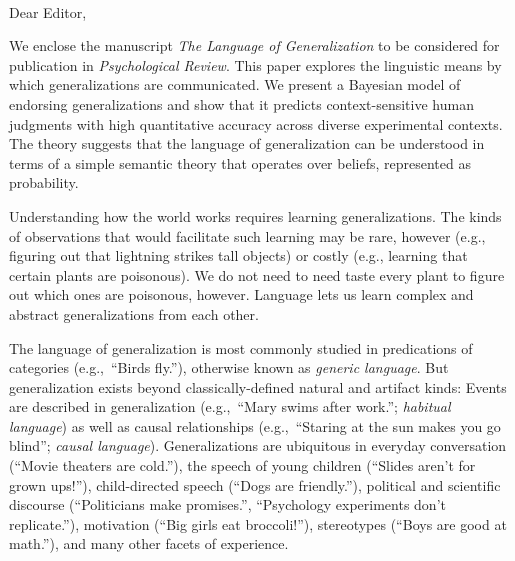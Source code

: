 \documentclass[11pt,letterpaper]{letter} %
\def\opening#1{\thispagestyle{empty}
{\centering\fromaddress \vspace{0.6in} \\ %
\hspace*{\longindentation}\hspace*{\fill}\par} %
\vspace{0.4in} %
\noindent #1 %
}
\begin{document}
\begin{letter}

\opening{Dear Editor,}

We enclose the manuscript \emph{The Language of Generalization} to be considered for publication in \emph{Psychological Review}. 
This paper explores the linguistic means by which generalizations are communicated.  
We present a Bayesian model of endorsing generalizations and show that it predicts context-sensitive human judgments with high quantitative accuracy across diverse experimental contexts.
The theory suggests that the language of generalization can be understood in terms of a simple semantic theory that operates over beliefs, represented as probability.

Understanding how the world works requires learning generalizations. 
The kinds of observations that would facilitate such learning may be rare, however (e.g., figuring out that lightning strikes tall objects) or costly (e.g., learning that certain plants are poisonous).
We do not need to need taste every plant to figure out which ones are poisonous, however.
Language lets us learn complex and abstract generalizations from each other.

The language of generalization is most commonly studied in predications of categories (e.g.,~``Birds fly.''), otherwise known as \emph{generic language}.
But generalization exists beyond classically-defined natural and artifact kinds: Events are described in generalization (e.g.,~``Mary swims after work.''; \emph{habitual language}) as well as causal relationships (e.g.,~``Staring at the sun makes you go blind''; \emph{causal language}).
Generalizations are ubiquitous in everyday conversation (``Movie theaters are cold.''), the speech of young children (``Slides aren't for grown ups!''), child-directed speech (``Dogs are friendly.''), political and scientific discourse (``Politicians make promises.'', ``Psychology experiments don't replicate.''), motivation (``Big girls eat broccoli!''), stereotypes (``Boys are good at math.''), and many other facets of experience.



\end{letter}
\end{document}

